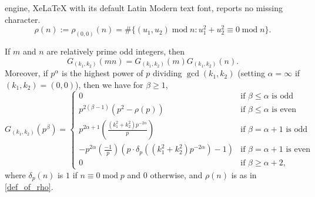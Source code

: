 \documentclass[10pt,a4paper]{amsart}
\def\gcd{\operatorname{gcd}}
\def\mod{\operatorname{mod}}
\begin{document}
engine, XeLaTeX with its default Latin Modern text font, reports no missing character.
\begin{equation}\label{def_of_rho}
\rho(n):=\rho_{(0,0)}(n)=\#\{ (u_1,u_2)\mod n : u_1^2+u_2^2\equiv 0 \mod n \}.    
\end{equation}

\begin{proposition}\label{G_k(n) conditions}
If $m$ and $n$ are relatively prime odd integers, then $$G_{(k_1,k_2)}(mn)=G_{(k_1,k_2)}(m)G_{(k_1,k_2)}(n).$$ Moreover, if $p^{\alpha}$ is the highest power of $p$  dividing $\gcd(k_1,k_2)$ (setting $\alpha=\infty$ if $(k_1,k_2)=(0,0)$), then we have for $\beta\geq 1$,
$$ G_{(k_1,k_2)}(p^{\beta}) = \begin{cases}
    0 & \text{if } \beta\leq \alpha \text{ is odd} \\
    p^{2(\beta-1)} (p^2 - \rho(p)) & \text{if } \beta\leq \alpha \text{ is even} \\
    p^{2\alpha+1} \left( \frac{(k_1^2+k_2^2)p^{-2\alpha}}{p}\right) & \text{if } \beta = \alpha + 1 \text{ is odd} \\ 
    -p^{2\alpha}\left( \frac{-1}{p} \right)(p\cdot \delta_p((k_1^2+k_2^2)p^{-2\alpha}) - 1)  & \text{if } \beta=\alpha + 1 \text{ is even} \\
    0 & \text{if } \beta\geq \alpha+2,
\end{cases} $$
where $\delta_p(n)$ is $1$ if $n\equiv 0 \mod p$ and $0$ otherwise, and $\rho(n)$ is as in \eqref{def_of_rho}.
\end{proposition}
\end{document}
